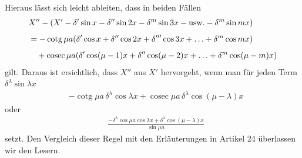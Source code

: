 Hieraus lässt sich leicht ableiten, dass in beiden Fällen
\[
\begin{aligned}
&X''-(X'-\delta'\sin x-\delta''\sin2x-\delta^m\sin3x-\text{usw.}-\delta^m\sin mx)\\[5pt]
&=-\operatorname{cotg}\mu a(\delta'\cos x+\delta''\cos2x+\delta'''\cos3x+\mathinner{.\,.\,.}+\delta^m\cos mx)\\[5pt]
&\quad+\operatorname{cosec}\mu a(\delta'\cos(\mu-1)x+\delta''\cos(\mu-2)x+\mathinner{.\,.\,.}+\delta^m\cos(\mu-m)x)
\end{aligned}
\]
gilt. Daraus ist ersichtlich, dass $X''$ aus $X'$ hervorgeht, wenn man für jeden Term $\delta^\lambda\sin\lambda x$
\[
\begin{aligned}
&-\operatorname{cotg}\mu a\,\delta^\lambda\cos\lambda x+\operatorname{cosec}\mu a\,\delta^\lambda\cos(\mu-\lambda)x
\end{aligned}
\]
oder
\[
\begin{aligned}
&\frac{-\delta^\lambda\cos\mu a\cos\lambda x+\delta^\lambda\cos(\mu-\lambda)x}{\sin\mu a}
\end{aligned}
\]
setzt. Den Vergleich dieser Regel mit den Erläuterungen in Artikel 24 überlassen wir den Lesern.

